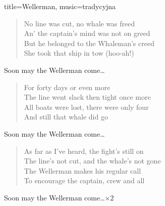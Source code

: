 \begin{song}{title={Wellerman}, music={tradycyjna}}
\begin{multicols}{2}
\begin{verse}
        No line was cut, no whale was freed \\
        An' the captain's mind was not on greed \\
        But he belonged to the Whaleman's creed \\
        She took that ship in tow (hoo-ah!)
    \end{verse}
    \begin{chorus}
        Soon may the Wellerman come\ldots
    \end{chorus}
    \begin{verse}
        For forty days or even more \\
        The line went slack then tight once more \\
        All boats were lost, there were only four \\
        And still that whale did go
    \end{verse}
    \begin{chorus}
        Soon may the Wellerman come\ldots
    \end{chorus}
    \begin{verse}
        As far as I've heard, the fight's still on \\
        The line's not cut, and the whale's not gone \\
        The Wellerman makes his regular call \\
        To encourage the captain, crew and all
    \end{verse}
    \begin{chorus}
        Soon may the Wellerman come\ldots $\times 2$
    \end{chorus}
\end{multicols}
\end{song}

